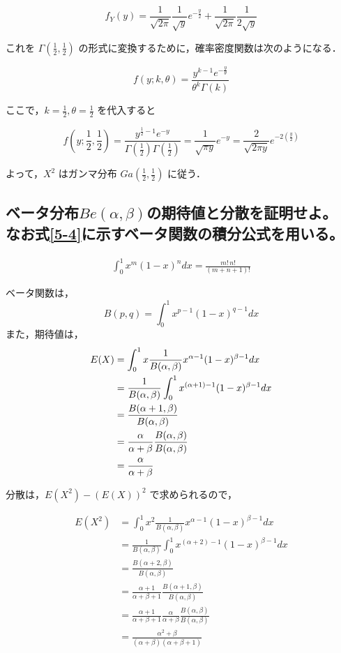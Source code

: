 \documentclass[titlepage,a4paper]{jsarticle}
\begin{document}
\[
  f_Y(y) = \frac{1}{\sqrt{2\pi}} \frac{1}{\sqrt{y}} e^{-\frac{y}{2}} + \frac{1}{\sqrt{2\pi}} \frac{1}{2\sqrt{y}}
\]

これを \( \Gamma\left(\frac{1}{2}, \frac{1}{2}\right) \) の形式に変換するために，確率密度関数は次のようになる．

\[
  f(y; k, \theta) = \frac{y^{k-1} e^{-\frac{y}{\theta}}}{\theta^k \Gamma(k)}
\]

ここで，\( k = \frac{1}{2}, \theta = \frac{1}{2} \) を代入すると

\[
  f(y; \frac{1}{2}, \frac{1}{2}) = \frac{y^{\frac{1}{2} - 1} e^{-y}}{\Gamma(\frac{1}{2}) \Gamma(\frac{1}{2})} = \frac{1}{\sqrt{\pi y}} e^{-y} = \frac{2}{\sqrt{2\pi y}} e^{-2(\frac{y}{2})}
\]

よって，\( X^2 \) はガンマ分布 \( Ga\left(\frac{1}{2}, \frac{1}{2}\right) \) に従う．
\subsection{ベータ分布$Be(\alpha, \beta)$の期待値と分散を証明せよ。 なお式\eqref{5-4}に示すベータ関数の積分公式を用いる。}
\begin{align}
  \int_0^1 x^m (1 - x)^n dx = \frac{m! \, n!}{(m + n + 1)!}  \label{5-4}
\end{align}

ベータ関数は，
\[
  B(p, q) = \int_0^1 x^{p-1} (1 - x)^{q-1} dx
\]
また，期待値は，
\begin{align}
  E(X) & = \int_0^1 x \frac{1}{B(\alpha, \beta)} x^{\alpha - 1} (1 - x)^{\beta - 1} dx \notag     \\
       & = \frac{1}{B(\alpha, \beta)} \int_0^1 x^{(\alpha + 1) - 1} (1 - x)^{\beta - 1} dx \notag \\
       & = \frac{B(\alpha + 1, \beta)}{B(\alpha, \beta)} \notag                                   \\
       & = \frac{\alpha}{\alpha + \beta} \frac{B(\alpha, \beta)}{B(\alpha, \beta)} \notag         \\
       & = \frac{\alpha}{\alpha + \beta}
\end{align}

分散は，$E(X^2) - (E(X))^2$ で求められるので，

\begin{align}
  E(X^2) & = \int_0^1 x^2 \frac{1}{B(\alpha, \beta)} x^{\alpha - 1} (1 - x)^{\beta - 1} dx                                 \\
         & = \frac{1}{B(\alpha, \beta)} \int_0^1 x^{(\alpha + 2) - 1} (1 - x)^{\beta - 1} dx                               \\
         & = \frac{B(\alpha + 2, \beta)}{B(\alpha, \beta)}                                                                 \\
         & = \frac{\alpha + 1}{\alpha + \beta + 1} \frac{B(\alpha + 1, \beta)}{B(\alpha, \beta)}                           \\
         & = \frac{\alpha + 1}{\alpha + \beta + 1} \frac{\alpha}{\alpha + \beta} \frac{B(\alpha, \beta)}{B(\alpha, \beta)} \\
         & = \frac{\alpha^2 + \beta}{(\alpha + \beta)(\alpha + \beta + 1)}
\end{align}
\end{document}
